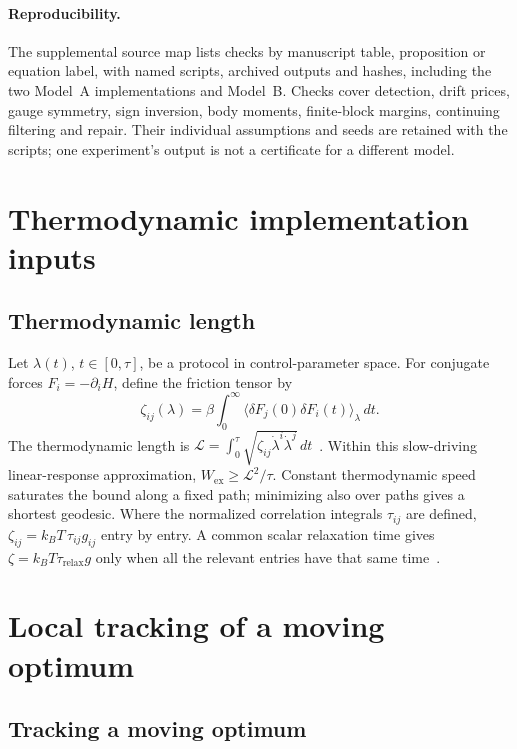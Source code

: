 \documentclass[12pt]{article}
\theoremstyle{definition}
\begin{document}
\paragraph{Reproducibility.}
The supplemental source map lists checks by manuscript table, proposition
or equation label, with named scripts, archived outputs and hashes,
including the two Model~A implementations and Model~B.
Checks cover detection, drift prices, gauge symmetry, sign inversion,
body moments, finite-block margins, continuing filtering and repair.
Their individual assumptions and seeds are retained with the scripts;
one experiment's output is not a certificate for a different model.

\section{Thermodynamic implementation inputs}
\subsection{Thermodynamic length}
\label{subsec:thermo_length}

Let $\lambda(t)$, $t\in[0,\tau]$, be a protocol in control-parameter space. For conjugate forces $F_i=-\partial_i H$, define the friction tensor by
\[
\zeta_{ij}(\lambda)=\beta\int_0^\infty
  \langle\delta F_j(0)\delta F_i(t)\rangle_{\lambda}\,dt.
\]
The thermodynamic length is $\mathcal L=\int_0^\tau\sqrt{\zeta_{ij}\dot\lambda^i\dot\lambda^j}\,dt$~\cite{Crooks2007}. Within this slow-driving linear-response approximation, $W_{\mathrm{ex}}\ge\mathcal L^2/\tau$. Constant thermodynamic speed saturates the bound along a fixed path; minimizing also over paths gives a shortest geodesic. Where the normalized correlation integrals $\tau_{ij}$ are defined, $\zeta_{ij}=k_BT\,\tau_{ij}g_{ij}$ entry by entry. A common scalar relaxation time gives $\zeta=k_BT\tau_{\mathrm{relax}}g$ only when all the relevant entries have that same time~\cite{SivakCrooks2012}.


\section{Local tracking of a moving optimum}
\subsection{Tracking a moving optimum}
\label{subsec:lyapunov}
\end{document}
